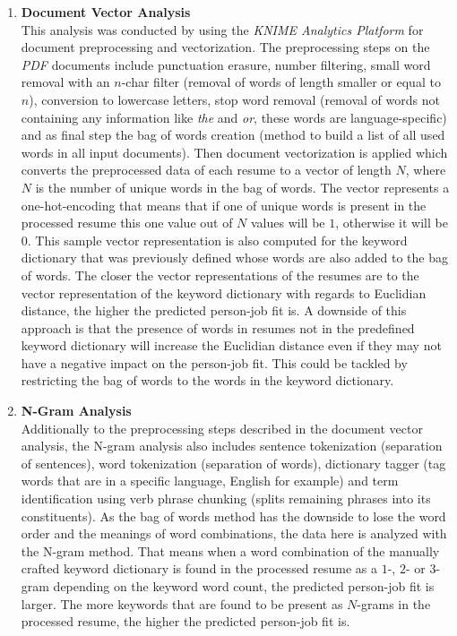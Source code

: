 \documentclass[draft,final]{thesisclass} %
\begin{document}
\begin{enumerate}
    \item \textbf{Document Vector Analysis}\\
    This analysis was conducted by using the \textit{KNIME Analytics Platform} for document preprocessing and vectorization.
    The preprocessing steps on the \textit{PDF} documents include punctuation erasure, number filtering, small word removal with an $n$-char filter (removal of words of length smaller or equal to $n$), conversion to lowercase letters, stop word removal (removal of words not containing any information like \textit{the} and \textit{or}, these words are language-specific) and as final step the bag of words creation (method to build a list of all used words in all input documents).
    Then document vectorization is applied which converts the preprocessed data of each resume to a vector of length $N$, where $N$ is the number of unique words in the bag of words.
    The vector represents a one-hot-encoding that means that if one of unique words is present in the processed resume this one value out of $N$ values will be $1$, otherwise it will be $0$.
    This sample vector representation is also computed for the keyword dictionary that was previously defined whose words are also added to the bag of words.
    The closer the vector representations of the resumes are to the vector representation of the keyword dictionary with regards to Euclidian distance, the higher the predicted person-job fit is.
    A downside of this approach is that the presence of words in resumes not in the predefined keyword dictionary will increase the Euclidian distance even if they may not have a negative impact on the person-job fit. 
    This could be tackled by restricting the bag of words to the words in the keyword dictionary.
    \item \textbf{N-Gram Analysis}\\
    Additionally to the preprocessing steps described in the document vector analysis, the N-gram analysis also includes sentence tokenization (separation of sentences), word tokenization (separation of words), dictionary tagger (tag words that are in a specific language, English for example) and term identification using verb phrase chunking (splits remaining phrases into its constituents).
    As the bag of words method has the downside to lose the word order and the meanings of word combinations, the data here is analyzed with the N-gram method.
    That means when a word combination of the manually crafted keyword dictionary is found in the processed resume as a $1$-, $2$- or $3$-gram depending on the keyword word count, the predicted person-job fit is larger.
    The more keywords that are found to be present as $N$-grams in the processed resume, the higher the predicted person-job fit is.
\end{enumerate}
\end{document}
